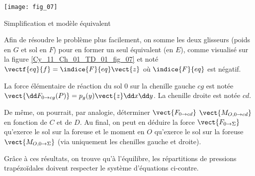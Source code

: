 \begin{marginfigure}
\centering
\texttt{[image: fig\_07]}
\caption{Simplification et modèle équivalent  \label{Cy_11_Ch_01_TD_01_fig_07}}
\end{marginfigure}





Afin de résoudre le problème plus 
facilement, on somme les deux 
glisseurs (poids en $G$ et sol en $F$) pour 
en former un seul équivalent (en $E$), 
comme visualisé sur la figure \ref{Cy_11_Ch_01_TD_01_fig_07} et noté 
$\vectf{eq}{f} = \indice{F}{eq} \vect{z}$ où $\indice{F}{eq}$ est négatif. 




 
La force élémentaire de réaction du sol 0 sur la chenille gauche $cg$ est notée 
$\vect{\dd F_{0\rightarrow cg}(P)} = p_g(y)\vect{z}\dd x\dd y $. 
La chenille droite est notée $cd$. 
 
 
 
 De même, on pourrait, par analogie, déterminer $\vect{F_{0\rightarrow cd}}$ $\vect{M_{O,0\rightarrow cd}}$ en fonction de $C$ et de $D$. Au final, 
on peut en déduire la force $\vect{F_{0\rightarrow \Sigma}}$
 qu’exerce le sol sur la foreuse et le moment en $O$ qu’exerce le sol 
sur la foreuse $\vect{M_{O,0\rightarrow \Sigma}}$
 (via uniquement les chenilles gauche et droite).
 
 
Grâce à ces résultats, on trouve qu’à l’équilibre, les répartitions de pressions trapézoïdales doivent respecter le système d’équations ci-contre.


